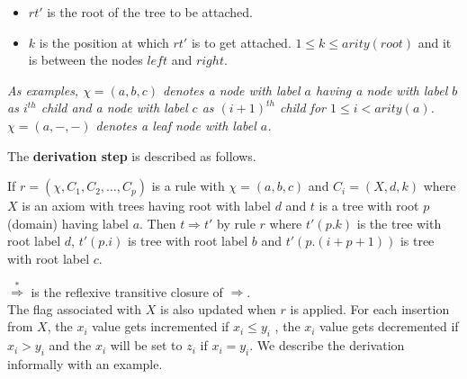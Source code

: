 \begin{definition}
\begin{itemize}
{\begin{itemize}
             \begin{itemize}    
                \item $rt'$ is the root of the tree to be attached.%
                \item $k$ is the position at which $rt'$ is to get attached. $1\le k \leq arity(root)$ and it is between the nodes $left$ and $right$.
             \end{itemize}
          \end{itemize}
          {\small \emph{As examples,  $\chi = (a,b,c)$ denotes a node with label $a$ having a node with label $b$ as $i^{th}$ 
         child and a node with label $c$ as $(i+1)^{th}$ child for $1\le i< arity(a)$. \\
         $\chi = (a,-,-)$ denotes a leaf node with label $a$.}} \\ 
    }
\end{itemize}
\end{definition}
The \textbf{derivation step} is described as follows.

If $r=(\chi ,C_1,C_2,\dots ,C_p)$ is a rule with $\chi =(a,b,c)$ and $C_i =(X,d,k)$ where $X$ is an axiom with trees having
root with label $d$ and $t$ is a tree with root $p$(domain) having label $a$. Then $t\Rightarrow t'$ by rule $r$ where $t'(p.k)$ 
is the tree with root label $d$, $t'(p.i)$ is tree with root label $b$ and $t'(p.(i+p+1))$ is tree with root label $c$.

$\overset{*}\Rightarrow $ is the reflexive transitive closure of $\Rightarrow$.\\

The flag associated with $X$ is also updated when $r$ is applied. For each insertion from $X$, the $x_i$ value gets incremented if $x_i\leq y_i$ ,  
    the $x_i$ value gets decremented if $x_i>y_i$ and the $x_i$ will be set to $z_i$ if $x_i=y_i$.
We describe the derivation informally with an example.

